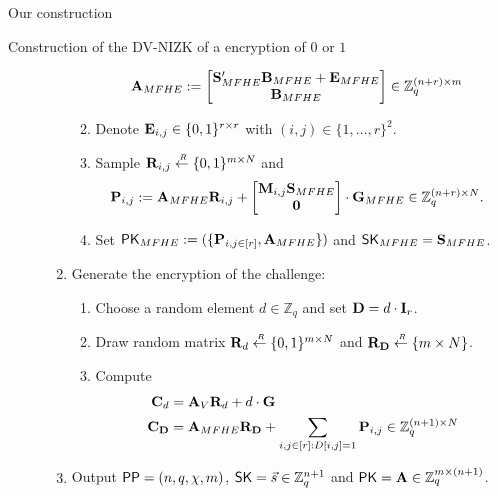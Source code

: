 \begin{section}{Our construction}
\begin{subsection}{Construction of the DV-NIZK of a encryption of $0$ or $1$}
\begin{description}
\begin{enumerate}
\begin{enumerate}
          \begin{align*}
            \mathbf{A}_{MFHE} &:= \begin{bmatrix}\mathbf{S}_{MFHE}'\mathbf{B}_{MFHE} + \mathbf{E}_{MFHE} \\ \mathbf{B}_{MFHE}\end{bmatrix} \in \mathbb{Z}_q^{(n+r) \times m}
          \end{align*}
        \item Denote $\mathbf{E}_{i,j} \in \{0, 1\}^{r\times r}$ with $(i,j) \in \{1, \dots ,r\}^2$.
        \item Sample $\mathbf{R}_{i,j} \stackrel{{\scriptscriptstyle \mkern4mu R}}{\gets} \{0,1\}^{m \times N}$ and
          \begin{align*}
            \mathbf{P}_{i,j} &:= \mathbf{A}_{MFHE} \mathbf{R}_{i,j} + \begin{bmatrix}\mathbf{M}_{i,j}\mathbf{S}_{MFHE}\\ \mathbf{0}\end{bmatrix}\cdot  \mathbf{G}_{MFHE} \in \mathbb{Z}_q^{(n+r) \times N}.
          \end{align*}
        \item Set $\mathsf{PK}_{MFHE} := (\{\mathbf{P}_{i,j \in [r]}, \mathbf{A}_{MFHE}\})$ and $\mathsf{SK}_{MFHE} = \mathbf{S}_{MFHE}$.
        \end{enumerate}
      \item Generate the encryption of the challenge:
        \begin{enumerate}
        \item Choose a random element $d \in \mathbb{Z}_{q}$ and set $\mathbf{D} = d \cdot \mathbf{I}_r$.
        \item Draw random matrix $\mathbf{R}_d \stackrel{{\scriptscriptstyle \mkern4mu R}}{\gets} \{0,1\}^{m \times N}$ and $\mathbf{R}_{\mathbf{D}} \stackrel{{\scriptscriptstyle \mkern4mu R}}{\gets} \{m \times N\}$.
        \item Compute
          \begin{align*}
            \mathbf{C}_d &= \mathbf{A}_V \mathbf{R}_d + d \cdot \mathbf{G}\\
            \mathbf{C}_{\mathbf{D}} &= \mathbf{A}_{MFHE} \mathbf{R}_{\mathbf{D}} + \sum_{i,j \in [r]: D[i,j] = 1} \mathbf{P}_{i,j} \in \mathbb{Z}_q^{(n+1) \times N}
          \end{align*}
        \end{enumerate}
      \item Output ${\mathsf{PP}} = (n, q, \chi, m)$, $\mathsf{SK} = \vec{s} \in \mathbb{Z}_q^{n+1}$ and $\mathsf{PK} = \mathbf{A} \in \mathbb{Z}_q^{m \times (n+1)}$.
      \end{enumerate}




\end{description}
\end{subsection}
\end{section}
